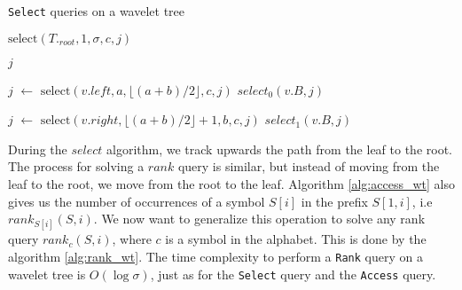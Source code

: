 \begin{algorithm}
    \caption{\texttt{Select} queries on a wavelet tree}\label{alg:select_wt}
    \begin{algorithmic}

        \State \Return $\text{select}(T._{root},1, \sigma, c, j)$
        \EndFunction

        \vspace{0.4cm}

        \State \Return $j$
        \EndIf

        \State $j$ $\gets$ $\text{select}(v.left, a, \lfloor (a+b)/2 \rfloor, c, j)$
        \Return $select_0(v.B,j)$

        \Else
        \State $j$ $\gets$ $\text{select}(v.right, \lfloor (a+b)/2 \rfloor +1, b, c, j)$
        \State \Return $select_1(v.B,j)$
        \EndIf

        \EndFunction

    \end{algorithmic}
\end{algorithm}

\noindent During the $select$ algorithm, we track upwards the path from the leaf to the root. The process for solving a $rank$ query is similar, but instead of moving from the leaf to the root, we move from the root to the leaf. Algorithm \ref{alg:access_wt} also gives us the number of occurrences of a symbol $S[i]$ in the prefix $S[1,i]$, i.e $rank_{S[i]}(S,i)$. We now want to generalize this operation to solve any rank query $rank_c(S,i)$, where $c$ is a symbol in the alphabet. This is done by the algorithm \ref{alg:rank_wt}. The time complexity to perform a \texttt{Rank} query on a wavelet tree is $O(\log \sigma)$, just as for the \texttt{Select} query and the \texttt{Access} query.


